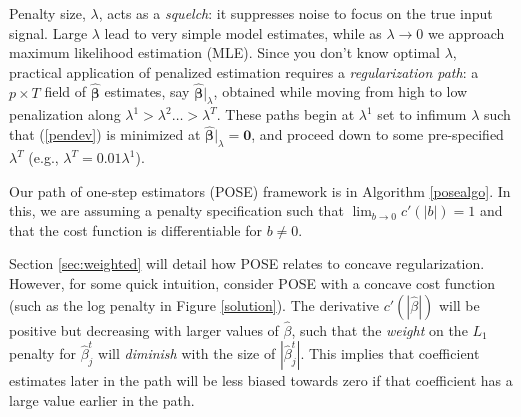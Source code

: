 \documentclass[12pt]{article}
\newcommand{\bs}[1]{\boldsymbol{#1}}
\newcommand{\bm}[1]{\mathbf{#1}}
\newcommand{\ds}[1]{\mathds{#1}}
\DeclareMathOperator*{\argmin}{argmin}
\begin{document}
Penalty size, $\lambda$, acts as a {\it squelch}: it suppresses noise to
focus on the true input signal. Large $\lambda$ lead to very simple 
model estimates, while as $\lambda \rightarrow 0$ we approach maximum
likelihood estimation (MLE). Since you don't know optimal $\lambda$,
practical application of penalized estimation requires a {\it regularization
path}: a $p \times T$ field of $\bs{\hat\beta}$ estimates, say $\bs{\hat\beta}\vert_{\lambda}$, obtained while
moving from high to low penalization along $\lambda^1 > \lambda^2 \ldots >
\lambda^T$.  These paths begin at $\lambda^1$ set to infimum $\lambda$ such that
(\ref{pendev}) is minimized at $\bs{\hat\beta}\vert_{\lambda} = \bm{0}$, and proceed down to some pre-specified $\lambda^T$ (e.g., $\lambda^T=
0.01\lambda^1$).

Our path of one-step estimators (POSE) framework is in  Algorithm \ref{posealgo}.   In this, we are assuming a penalty specification such that $\lim_{b\to 0} c'(|b|) = 1$ and that the cost function is differentiable for $b\neq 0$.  

{
}

Section \ref{sec:weighted} will detail how POSE relates to concave regularization.  However, for some quick intuition, consider POSE with a concave cost function (such as the log penalty in Figure \ref{solution}).
The derivative $c'(|\hat\beta|)$ will be positive but decreasing with larger values of  $\hat\beta$, such that the \textit{weight} on the $L_1$ penalty for $\hat\beta_j^{t}$ will \textit{diminish} with the size of $|\hat\beta_j^{t}|$.  This implies that coefficient estimates later in the path will be less biased towards zero if that coefficient has a large value earlier in the path.
\end{document}
